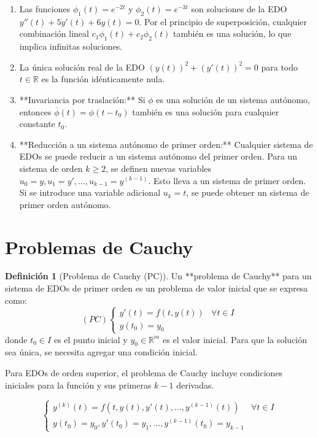 \documentclass[11pt]{article}
\theoremstyle{definition} %
\newtheorem{definition}[theorem]{Definición}
\begin{document}
\begin{enumerate}
    \item Las funciones $\phi_1(t) = e^{-2t}$ y $\phi_2(t) = e^{-3t}$ son soluciones de la EDO $y''(t) + 5y'(t) + 6y(t) = 0$. Por el principio de superposición, cualquier combinación lineal $c_1\phi_1(t) + c_2\phi_2(t)$ también es una solución, lo que implica infinitas soluciones.
    \item La única solución real de la EDO $(y(t))^2 + (y'(t))^2 = 0$ para todo $t \in \mathbb{R}$ es la función idénticamente nula.
    \item **Invariancia por traslación:** Si $\phi$ es una solución de un sistema autónomo, entonces $\overline{\phi}(t) = \phi(t-t_0)$ también es una solución para cualquier constante $t_0$.
    \item **Reducción a un sistema autónomo de primer orden:** Cualquier sistema de EDOs se puede reducir a un sistema autónomo del primer orden. Para un sistema de orden $k \ge 2$, se definen nuevas variables $u_0=y, u_1=y', \dots, u_{k-1}=y^{(k-1)}$. Esto lleva a un sistema de primer orden. Si se introduce una variable adicional $u_k = t$, se puede obtener un sistema de primer orden autónomo.
\end{enumerate}
\section{Problemas de Cauchy}
\label{sec:cauchy}

\begin{definition}[Problema de Cauchy (PC)]
Un **problema de Cauchy** para un sistema de EDOs de primer orden es un problema de valor inicial que se expresa como:
$$(PC) \begin{cases} y'(t) = f(t, y(t)) & \forall t \in I \\ y(t_0) = y_0 \end{cases}$$
donde $t_0 \in I$ es el punto inicial y $y_0 \in \mathbb{R}^m$ es el valor inicial. Para que la solución sea única, se necesita agregar una condición inicial.
\end{definition}

Para EDOs de orden superior, el problema de Cauchy incluye condiciones iniciales para la función y sus primeras $k-1$ derivadas.

\[
\begin{cases} y^{(k)}(t) = f(t, y(t), y'(t), \dots, y^{(k-1)}(t)) & \forall t \in I \\ y(t_0) = y_0, y'(t_0) = y_1, \dots, y^{(k-1)}(t_0) = y_{k-1} \end{cases}
\]
\end{document}
